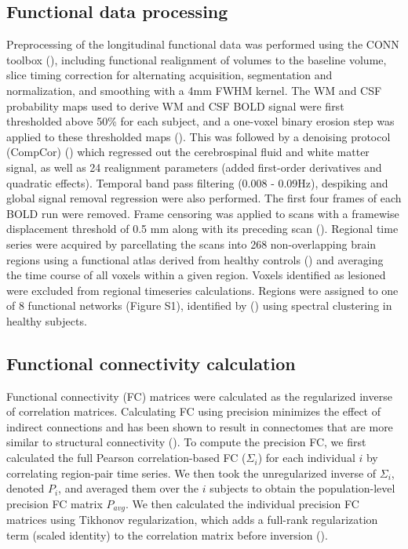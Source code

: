 \documentclass[phd,tocprelim]{cornell}
\begin{document}
	\subsection{Functional data processing}
	Preprocessing of the longitudinal functional data was performed using the CONN toolbox (\cite{Whitfield-Gabrieli2012-ox}), including functional realignment of volumes to the baseline volume, slice timing correction for alternating acquisition, segmentation and normalization, and smoothing with a 4mm FWHM kernel. The WM and CSF probability maps used to derive WM and CSF BOLD signal were first thresholded above 50\% for each subject, and a one-voxel binary erosion step was applied to these thresholded maps (\cite{Whitfield-Gabrieli2012-ox}). This was followed by a denoising protocol (CompCor) (\cite{Behzadi2007-zt}) which regressed out the cerebrospinal fluid and white matter signal, as well as 24 realignment parameters (added first-order derivatives and quadratic effects). Temporal band pass filtering (0.008 - 0.09Hz), despiking and global signal removal regression were also performed. The first four frames of each BOLD run were removed. Frame censoring was applied to scans with a framewise displacement threshold of 0.5 mm along with its preceding scan (\cite{Power2012-tq}). Regional time series were acquired by parcellating the scans into 268 non-overlapping brain regions using a functional atlas derived from healthy controls (\cite{Shen2013-zn}) and averaging the time course of all voxels within a given region. Voxels identified as lesioned were excluded from regional timeseries calculations. Regions were assigned to one of 8 functional networks (Figure S1), identified by (\cite{Finn2015-er}) using spectral clustering in healthy subjects.
	
	\subsection{Functional connectivity calculation}
	 Functional connectivity (FC) matrices were calculated as the regularized inverse of correlation matrices. Calculating FC using precision minimizes the effect of indirect connections and has been shown to result in connectomes that are more similar to structural connectivity (\cite{Wodeyar2020-kz, Liegeois2020-ua}). To compute the precision FC, we first calculated the full Pearson correlation-based FC ($\Sigma_i$) for each individual $i$ by correlating region-pair time series. We then took the unregularized inverse of $\Sigma_i$, denoted $P_i$, and averaged them over the $i$ subjects to obtain the population-level precision FC matrix $P_{avg}$. We then calculated the individual precision FC matrices using Tikhonov regularization, which adds a full-rank regularization term (scaled identity) to the correlation matrix before inversion (\cite{Liegeois2020-ua}).
	 
\end{document}
